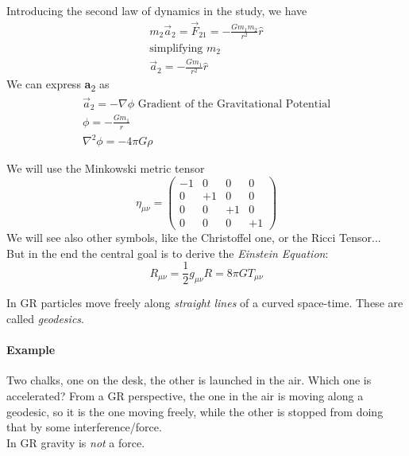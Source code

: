 \bigskip

Introducing the second law of dynamics in the study, we have
\begin{gather*}
m_{2}\vec{a}_{2} = \vec{F}_{21} = - \frac{Gm_{1}m_{2}}{r^{2}} \hat{r} \\
\text{simplifying } m_{2} \\
\vec{a}_{2} = - \frac{Gm_{1}}{r^{2}} \hat{r}  
\end{gather*}
We can express \textbf{a}\textsubscript{2} as 
\begin{gather*}
	\vec{a}_{2} = - \nabla \phi \text{ Gradient of the Gravitational Potential} \\
	\phi = - \frac{Gm_{1}}{r} \\
	\nabla^{2} \phi = -4\pi G \rho
\end{gather*}

We will use the Minkowski metric tensor 
\begin{equation}
	\eta_{\mu\nu} =
	\begin{pmatrix}
		-1 & 0 & 0 & 0 \\
		0 & +1 & 0 & 0 \\
		0 & 0 & +1 & 0 \\
		0 & 0 & 0 & +1 
	\end{pmatrix}
\end{equation}
 We will see also other symbols, like the Christoffel one, or the Ricci Tensor... \\
 But in the end the central goal is to derive the \emph{Einstein Equation}:
\begin{equation}
R_{\mu\nu} = \frac{1}{2} g_{\mu\nu}R = 8\pi G T_{\mu\nu}
\end{equation}

In GR particles move freely along \emph{straight lines} of a curved space-time. These are called \emph{geodesics}.

\paragraph{Example}
Two chalks, one on the desk, the other is launched in the air. Which one is accelerated?
From a GR perspective, the one in the air is moving along a geodesic, so it is the one moving freely, while the other is stopped from doing that by some interference/force. \\
In GR gravity is \emph{not} a force. 
